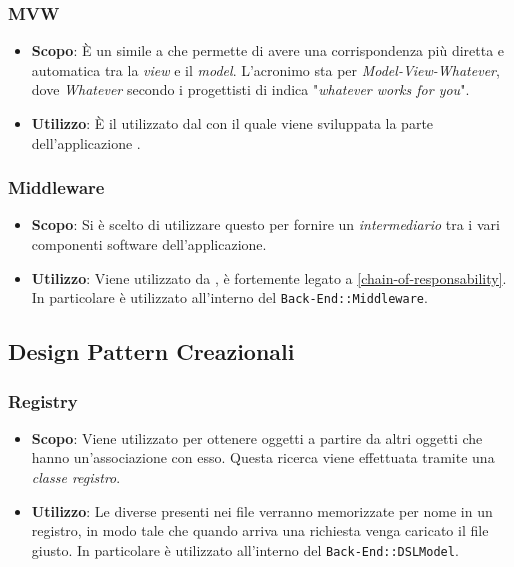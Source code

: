 \subsubsection{MVW}

\begin{itemize}

	\item \textbf{Scopo}: È un  simile a  che permette di avere una corrispondenza più diretta e automatica tra la \textit{view} e il \textit{model}. L'acronimo  sta per \textit{Model-View-Whatever}, dove \textit{Whatever} secondo i progettisti di  indica "\textit{whatever works for you}".
	\item \textbf{Utilizzo}: È il  utilizzato dal   con il quale viene sviluppata la parte  dell'applicazione .

\end{itemize}

\subsubsection{Middleware} 

\begin{itemize}

	\item \textbf{Scopo}: Si è scelto di utilizzare questo  per fornire un \textit{intermediario} tra i vari componenti software dell'applicazione.
	\item \textbf{Utilizzo}: Viene utilizzato da , è fortemente legato a \ref{chain-of-responsability}. In particolare è utilizzato all'interno del  \texttt{Back-End::Middleware}.

\end{itemize}

\subsection{Design Pattern Creazionali}

\subsubsection{Registry}

\begin{itemize}

	\item \textbf{Scopo}: Viene utilizzato per ottenere oggetti a partire da altri oggetti che hanno un'associazione con esso. Questa ricerca viene effettuata tramite una \textit{classe registro}.
	\item \textbf{Utilizzo}: Le diverse  presenti nei file  verranno memorizzate per nome in un registro, in modo tale che quando arriva una richiesta venga caricato il file  giusto. In particolare è utilizzato all'interno del  \texttt{Back-End::DSLModel}.

\end{itemize}

